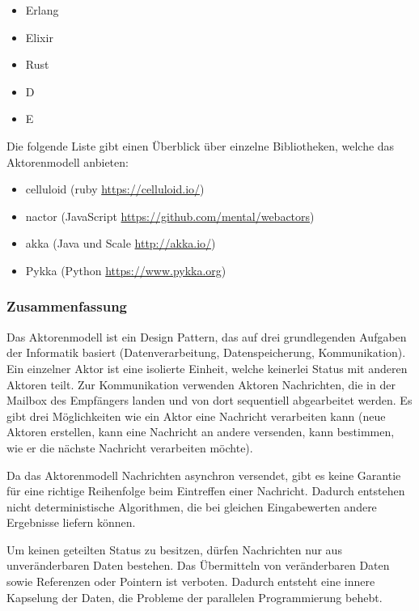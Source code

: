 \begin{itemize}
  \item Erlang
  \item Elixir
  \item Rust
  \item D
  \item E
\end{itemize}

Die folgende Liste gibt einen Überblick über einzelne Bibliotheken, welche das Aktorenmodell anbieten:

\begin{itemize}
  \item celluloid (ruby \url{https://celluloid.io/})
  \item nactor (JavaScript \url{https://github.com/mental/webactors})
  \item akka (Java und Scale \url{http://akka.io/})
  \item Pykka (Python \url{https://www.pykka.org})
\end{itemize}

\subsubsection{Zusammenfassung}
Das Aktorenmodell ist ein Design Pattern, das auf drei grundlegenden Aufgaben der Informatik basiert (Datenverarbeitung, Datenspeicherung, Kommunikation). Ein einzelner Aktor ist eine isolierte Einheit, welche keinerlei Status mit anderen Aktoren teilt. Zur Kommunikation verwenden Aktoren Nachrichten, die in der Mailbox des Empfängers landen und von dort sequentiell abgearbeitet werden. Es gibt drei Möglichkeiten wie ein Aktor eine Nachricht verarbeiten kann (neue Aktoren erstellen, kann eine Nachricht an andere versenden, kann bestimmen, wie er die nächste Nachricht verarbeiten möchte).

Da das Aktorenmodell Nachrichten asynchron versendet, gibt es keine Garantie für eine richtige Reihenfolge beim Eintreffen einer Nachricht. Dadurch entstehen nicht deterministische Algorithmen, die bei gleichen Eingabewerten andere Ergebnisse liefern können.

Um keinen geteilten Status zu besitzen, dürfen Nachrichten nur aus unveränderbaren Daten bestehen. Das Übermitteln von veränderbaren Daten sowie Referenzen oder Pointern ist verboten. Dadurch entsteht eine innere Kapselung der Daten, die Probleme der parallelen Programmierung behebt.